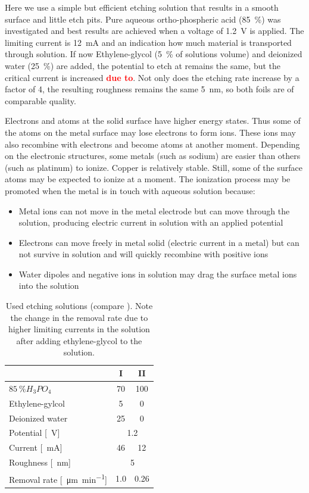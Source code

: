 Here we use a simple but efficient etching solution that results in a smooth surface and little etch pits. Pure aqueous ortho-phospheric acid (\SI{85}{\percent}) was investigated \cite{jinshan_electrochemical_2004} and best results are achieved when a voltage of \SI{1.2}{\volt} is applied. The limiting current is \SI{12}{\milli \ampere} and an indication how much material is transported through solution. If now Ethylene-glycol (\SI{5}{\percent} of solutions volume) and deionized water (\SI{25}{\percent}) are added, the potential to etch at remains the same, but the critical current is increased \textcolor{red}{\textbf{due to}}. Not only does the etching rate increase by a factor of 4, the resulting roughness remains the same \SI{5}{\nano \meter}, so both foils are of comparable quality.

Electrons and atoms at the solid surface have higher energy states. Thus some of the atoms on the metal surface may lose electrons to form ions. These ions may also recombine with electrons and become atoms at another moment. Depending on the electronic structures, some metals (such as sodium) are easier than others (such as platinum) to ionize. Copper is relatively stable. Still, some of the surface atoms may be expected to ionize at a moment. The ionization process may be promoted when the metal is in touch with aqueous solution because: 
\begin{itemize}
	\item Metal ions can not move in the metal electrode but can move through the solution, producing electric current in solution with an applied potential
	\item Electrons can move freely in metal solid (electric current in a metal) but can not survive in solution and will quickly recombine with positive ions
	\item Water dipoles and negative ions in solution may drag the surface metal ions into the solution
\end{itemize}

\begin{table}\centering
	\caption{Used etching solutions (compare \cite[130]{jinshan_electrochemical_2004}). Note the change in the removal rate due to higher limiting currents in the solution after adding ethylene-glycol to the solution.}
	\begin{tabular}{lcc}
		& I & II \\ \hline \hline
		$\SI{85}{\percent} H_3PO_4$ & 70 & 100 \\
		Ethylene-gylcol & 5 & 0 \\
		Deionized water & 25 & 0 \\ \hline
		Potential [\SI{}{\V}] & \multicolumn{2}{c}{\SI{1.2}{}} \\
		Current [\SI{}{\mA}] & 46 & 12\\
		Roughness [\SI{}{\nm}] & \multicolumn{2}{c}{\SI{5}{}} \\
		Removal rate [\SI{}{\micro\meter\per\minute}] & \SI{1,0}{} & \SI{0,26}{}\\
	\end{tabular}
	\label{table:used-etching-solutions}
\end{table}

